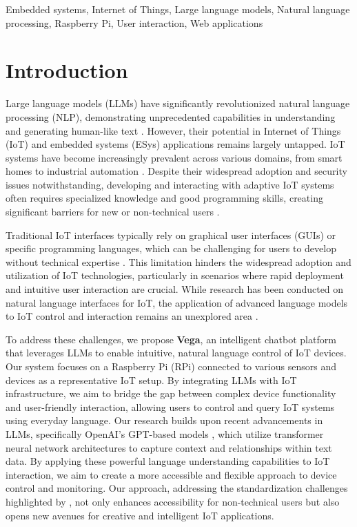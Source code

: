 \documentclass{ieeeaccess}
\begin{document}
\begin{keywords}
    Embedded systems, Internet of Things, Large language models, Natural language processing, Raspberry Pi, User interaction, Web applications
\end{keywords}

\titlepgskip=-21pt

\maketitle

\section{Introduction}\label{sec:introduction}

Large language models (LLMs) have significantly revolutionized natural language processing (NLP), demonstrating unprecedented capabilities in understanding and generating human-like text \cite{10.1145/3641289}. However, their potential in Internet of Things (IoT) and embedded systems (ESys) applications remains largely untapped. IoT systems have become increasingly prevalent across various domains, from smart homes to industrial automation \cite{8355897}. Despite their widespread adoption and security issues notwithstanding, developing and interacting with adaptive IoT systems often requires specialized knowledge and good programming skills, creating significant barriers for new or non-technical users \cite{10.1145/3447526.3472036}.

Traditional IoT interfaces typically rely on graphical user interfaces (GUIs) or specific programming languages, which can be challenging for users to develop without technical expertise \cite{10.1145/3447526.3472036}. This limitation hinders the widespread adoption and utilization of IoT technologies, particularly in scenarios where rapid deployment and intuitive user interaction are crucial. While research has been conducted on natural language interfaces for IoT, the application of advanced language models to IoT control and interaction remains an unexplored area \cite{KASSAB2020102663}.

To address these challenges, we propose \textbf{Vega}, an intelligent chatbot platform that leverages LLMs to enable intuitive, natural language control of IoT devices. Our system focuses on a Raspberry Pi (RPi) connected to various sensors and devices as a representative IoT setup. By integrating LLMs with IoT infrastructure, we aim to bridge the gap between complex device functionality and user-friendly interaction, allowing users to control and query IoT systems using everyday language. Our research builds upon recent advancements in LLMs, specifically OpenAI's GPT-based models \cite{OpenAI_GPT}, which utilize transformer neural network architectures to capture context and relationships within text data. By applying these powerful language understanding capabilities to IoT interaction, we aim to create a more accessible and flexible approach to device control and monitoring. Our approach, addressing the standardization challenges highlighted by \citet{7821686}, not only enhances accessibility for non-technical users but also opens new avenues for creative and intelligent IoT applications.
\end{document}
